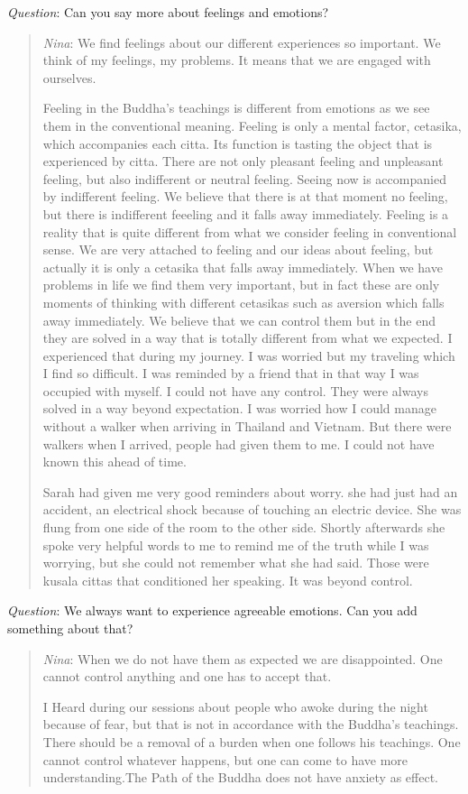 \documentclass[10pt,a4paper,oneside]{article}
\begin{document}
\textit{Question}: Can you say more about feelings and emotions?
\begin{quote}
\textit{Nina}: We find feelings about our different experiences so important. We think of my feelings, my problems. It means that we are engaged with ourselves. 

Feeling in the Buddha’s teachings is different from  emotions as we see them in the conventional meaning. Feeling is only a mental factor, cetasika, which accompanies each citta. Its function is tasting the object that is experienced by citta. There are not only pleasant feeling and unpleasant feeling, but also indifferent or neutral feeling. Seeing now is accompanied by indifferent feeling. We believe that there is at that moment no feeling, but there is indifferent feeeling and it falls away immediately. Feeling is a reality that is quite different from what we consider feeling in conventional sense. We are very attached to feeling and our ideas about feeling, but actually it is only a cetasika that falls away immediately.
When we have problems in life we find them very important, but in fact these are only moments of thinking with different cetasikas such as aversion which falls away immediately. We believe that we can control them but in the end they are solved in a way that is totally different from what we expected. I experienced that during my journey. I was worried but my traveling which I find so difficult. I was reminded by a friend that in that way I was occupied with myself. I could not have any control. They were always solved in a way beyond expectation. I was worried how I could manage without a walker when arriving in Thailand and Vietnam. But there were walkers when I arrived, people had given them to me. I could not have known this ahead of time. 

Sarah had given me very good reminders about worry. she had just had an accident, an electrical shock because of touching an electric device. She was flung from one side of the room to the other side. Shortly afterwards she spoke very helpful words to me to remind me of the truth while I was worrying, but she could not remember what she had said. Those were kusala cittas that conditioned her speaking. It was beyond control.
\end{quote}

\textit{Question}: We always want to experience agreeable emotions. Can you add something about that?
\begin{quote}
\textit{Nina}: When we do not have them as expected we are disappointed. One cannot control anything and one has to accept that. 

I Heard during our sessions about people who awoke during the night because of fear, but that is not in accordance with the Buddha’s teachings. There should be a removal of a burden when one follows his teachings. One cannot control whatever happens, but one can come to have more understanding.The Path of the Buddha does not have anxiety as effect. 
\end{quote}
\end{document}
